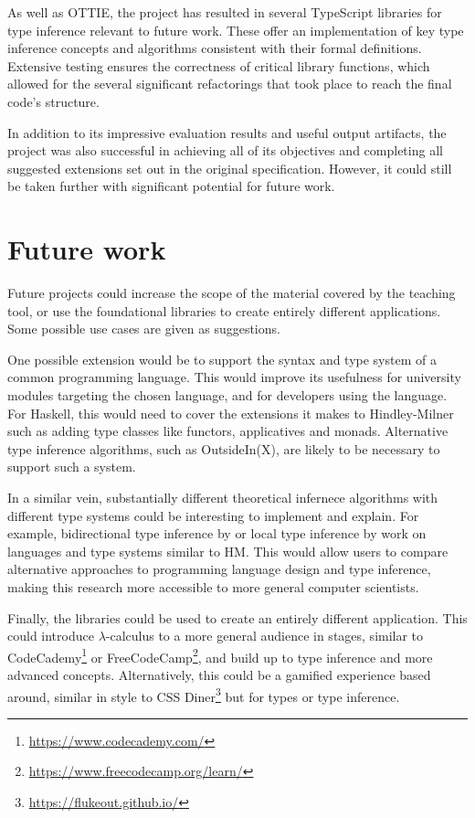 \documentclass[a4paper,fleqn,oneside,12pt]{report}
\begin{document}
As well as OTTIE, the project has resulted in several TypeScript libraries for type inference relevant to future work. These offer an implementation of key type inference concepts and algorithms consistent with their formal definitions. Extensive testing ensures the correctness of critical library functions, which allowed for the several significant refactorings that took place to reach the final code's structure.

In addition to its impressive evaluation results and useful output artifacts, the project was also successful in achieving all of its objectives and completing all suggested extensions set out in the original specification. However, it could still be taken further with significant potential for future work.

\section{Future work}

Future projects could increase the scope of the material covered by the teaching tool, or use the foundational libraries to create entirely different applications. Some possible use cases are given as suggestions.

One possible extension would be to support the syntax and type system of a common programming language. This would improve its usefulness for university modules targeting the chosen language, and for developers using the language. For Haskell, this would need to cover the extensions it makes to Hindley-Milner such as adding type classes like functors, applicatives and monads. Alternative type inference algorithms, such as OutsideIn(X), are likely to be necessary to support such a system.

In a similar vein, substantially different theoretical infernece algorithms with different type systems could be interesting to implement and explain. For example, bidirectional type inference by \cite{ref38} or local type inference by \cite{ref39} work on languages and type systems similar to HM. This would allow users to compare alternative approaches to programming language design and type inference, making this research more accessible to more general computer scientists.

Finally, the libraries could be used to create an entirely different application. This could introduce $\lambda$-calculus to a more general audience in stages, similar to CodeCademy\footnote{\href{https://www.codecademy.com/}{https://www.codecademy.com/}} or FreeCodeCamp\footnote{\href{https://www.freecodecamp.org/learn/}{https://www.freecodecamp.org/learn/}}, and build up to type inference and more advanced concepts. Alternatively, this could be a gamified experience based around, similar in style to CSS Diner\footnote{\href{https://flukeout.github.io/}{https://flukeout.github.io/}} but for types or type inference.
\end{document}
